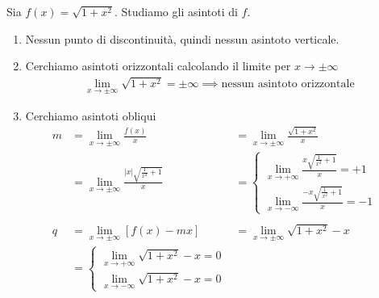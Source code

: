 \documentclass{book}
\begin{document}
\begin{example}
    Sia \(f(x) = \sqrt{1+x^2}\). Studiamo gli asintoti di \(f\).
    \begin{enumerate}
        \item  Nessun punto di discontinuità, quindi nessun asintoto verticale.
        \item  Cerchiamo asintoti orizzontali calcolando il limite per \(x \to \pm \infty\)
              \begin{align*}
                  \lim_{x \to \pm\infty} \sqrt{1+x^2} = \pm\infty \implies \text{nessun asintoto orizzontale}
              \end{align*}
        \item Cerchiamo asintoti obliqui
              \begin{align*}
                  m & = \lim_{x \to \pm\infty} \frac{f(x)}{x}                                    & =                   \lim_{x \to \pm\infty} \frac{\sqrt{1+x^2}}{x} & \\
                    & = \lim_{x \to \pm\infty} \frac{|x|\sqrt{\frac{1}{x^2}+1}}{x}               & =\begin{cases}
                                                                                                        \lim_{x \to +\infty} \frac{x\sqrt{\frac{1}{x^2}+1}}{x} = +1 \\
                                                                                                        \lim_{x \to -\infty} \frac{-x\sqrt{\frac{1}{x^2}+1}}{x} = -1
                                                                                                    \end{cases}  &      \\
                  \\
                  q & = \lim_{x \to \pm\infty} [f(x) - mx]                                       & = \lim_{x \to \pm\infty} \sqrt{1+x^2} - x                         & \\
                    & =                                                            \begin{cases}
                                                                                       \lim_{x \to +\infty} \sqrt{1+x^2} - x = 0 \\
                                                                                       \lim_{x \to -\infty} \sqrt{1+x^2} - x = 0
                                                                                   \end{cases} &                                                                   &   \\

\end{align*}
\end{enumerate}
\end{example}
\end{document}
